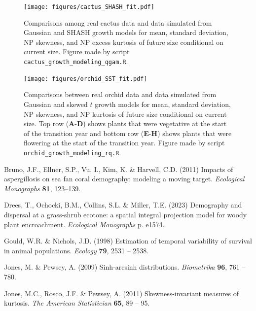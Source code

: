 \documentclass[12pt]{article}
\begin{document}
\begin{spacing}{1.35}
 \begin{figure}[h!]
 	\centering
 	\texttt{[image: figures/cactus\_SHASH\_fit.pdf]}
 	\caption{Comparisons among real cactus data and data simulated from Gaussian and SHASH growth models for mean, standard deviation, NP skewness, and NP excess kurtosis of future size conditional on current size. Figure made by script \texttt{cactus\_growth\_modeling\_qgam.R}.}
 	\label{fig:cactus_fit}
 \end{figure} 

\begin{figure}[h!]
	\centering
	\texttt{[image: figures/orchid\_SST\_fit.pdf]}
	\caption{Comparisons between real orchid data and data simulated from Gaussian and skewed $t$ growth models for mean, standard deviation, NP skewness, and NP kurtosis of future size conditional on current size. Top row (\textbf{A}-\textbf{D}) shows plants that were vegetative at the start of the transition year and bottom row (\textbf{E}-\textbf{H}) shows plants that were flowering at the start of the transition year. Figure made by script \texttt{orchid\_growth\_modeling\_rq.R}.}
	\label{fig:orchid_SST_fit}
\end{figure} 

\clearpage
\newpage 

\begin{thebibliography}{62}
\providecommand{\natexlab}[1]{#1}

Bruno, J.F., Ellner, S.P., Vu, I., Kim, K. \& Harvell, C.D. (2011) Impacts of
  aspergillosis on sea fan coral demography: modeling a moving target.
  \emph{Ecological Monographs} \textbf{81}, 123--139.

Drees, T., Ochocki, B.M., Collins, S.L. \& Miller, T.E. (2023) Demography and
  dispersal at a grass-shrub ecotone: a spatial integral projection model for
  woody plant encroachment. \emph{Ecological Monographs} p. e1574.

Gould, W.R. \& Nichols, J.D. (1998) Estimation of temporal variability of
  survival in animal populations. \emph{Ecology} \textbf{79}, 2531 -- 2538.

Jones, M. \& Pewsey, A. (2009) Sinh-arcsinh distributions. \emph{Biometrika}
  \textbf{96}, 761 -- 780.

Jones, M.C., Rosco, J.F. \& Pewsey, A. (2011) Skewness-invariant measures of
  kurtosis. \emph{The American Statistician} \textbf{65}, 89 -- 95.


\end{thebibliography}
\end{spacing}
\end{document}
